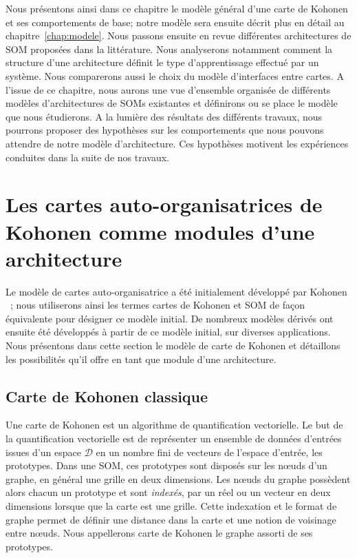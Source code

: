 \documentclass[../main]{subfiles}
\begin{document}
Nous présentons ainsi dans ce chapitre le modèle général d'une carte de Kohonen et ses comportements de base; notre modèle sera ensuite décrit plus en détail au chapitre~\ref{chap:modele}.
Nous passons ensuite en revue différentes architectures de SOM proposées dans la littérature. 
Nous analyserons notamment comment la structure d'une architecture définit le type d'apprentissage effectué par un système. Nous comparerons aussi le choix du modèle d'interfaces entre cartes.
A l'issue de ce chapitre, nous aurons une vue d'ensemble organisée de différents modèles d'architectures de SOMs existantes et définirons ou se place le modèle que nous étudierons.
A la lumière des résultats des différents travaux, nous pourrons proposer des hypothèses sur les comportements que nous pouvons attendre de notre modèle d'architecture. 
Ces hypothèses motivent les expériences conduites dans la suite de nos travaux. 

\section{Les cartes auto-organisatrices de Kohonen comme modules d'une architecture}\label{sec:som001}

Le modèle de cartes auto-organisatrice a été initialement développé par Kohonen \cite{Kohonen1982}~; nous utiliserons ainsi les termes cartes de Kohonen et SOM de façon équivalente pour désigner ce modèle initial.
De nombreux modèles dérivés ont ensuite été développés à partir de ce modèle initial, sur diverses applications.
Nous présentons dans cette section le modèle de carte de Kohonen et détaillons les possibilités qu'il offre en tant que module d'une architecture. 

\subsection{Carte de Kohonen classique}

Une carte de Kohonen est un algorithme de quantification vectorielle. Le but de la quantification vectorielle est de représenter un ensemble de données d'entrées issues d'un espace $\mathcal{D}$ en un nombre fini de vecteurs de l'espace d'entrée, les prototypes. Dans une SOM, ces prototypes sont disposés sur les n\oe{}uds d'un graphe, en général une grille en deux dimensions.
Les n\oe{}uds du graphe possèdent alors chacun un prototype et sont \emph{indexés}, par un réel ou un vecteur en deux dimensions lorsque que la carte est une grille.
Cette indexation et le format de graphe permet de définir une distance dans la carte et une notion de voisinage entre n\oe{}uds.
Nous appellerons carte de Kohonen le graphe assorti de ses prototypes.
\end{document}
